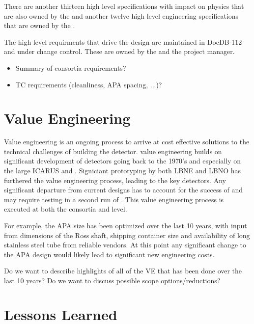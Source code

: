 There are another thirteen high level specifications with impact on
physics that are also owned by the  and another twelve high
level engineering specifications that are owned by the .

The high level  requirments that drive the  design are
maintained in DocDB-112 and under change control. These are owned by
the   and the  project manager.

\begin{itemize}
 \item Summary of consortia requirements?
 \item TC requirements (cleanliness, APA spacing, ...)?
\end{itemize}


\section{Value Engineering}
\label{sec:fdsp-coord-ve}

Value engineering is an ongoing process to arrive at cost effective
solutions to the technical challenges of building the 
detector.  value engineering builds on significant
development of  detectors going back to the 1970's and
especially on the large  ICARUS and
. Signiciant prototyping by both LBNE and LBNO has
furthered the value engineering process, leading to the key
 detectors. Any significant departure from current
designs has to account for the success of  and may
require testing in a second run of . This value
engineering process is executed at both the consortia and 
level.

For example, the APA size has been optimized over the last 10 years,
with input from dimensions of the Ross shaft, shipping container size
and availability of long stainless steel tube from reliable vendors.
At this point any significant change to the APA design would likely
lead to significant new engineering costs.

Do we want to describe highlights of all of the VE that has been done
over the last 10 years? Do we want to discuss possible scope options/reductions?

\section{Lessons Learned}
\label{sec:fdsp-coord-lessons}

